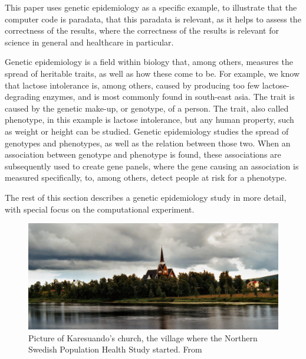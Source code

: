 This paper uses genetic epidemiology as a specific example,
to illustrate that the computer code is paradata,
that this paradata is relevant, as it helps 
to assess the correctness of the results,
where the correctness of the results is relevant for 
science in general and healthcare in particular.


Genetic epidemiology is a field within biology that, among 
others, measures the spread of heritable traits,
as well as how these come to be.
For example, we know that lactose intolerance is, among others,
caused by producing too few lactose-degrading enzymes,
and is most commonly found in south-east asia.
The trait is caused by the genetic make-up, or genotype, of a person.
The trait, also called phenotype, in this example is lactose intolerance,
but any human property, such as weight or height can be studied.
Genetic epidemiology studies the spread of genotypes and phenotypes,
as well as the relation between those two.
When an association between genotype and phenotype is found,
these associations are subsequently used to 
create gene panels, where the gene causing 
an association is measured specifically, to, among others,
detect people at risk for a phenotype.

The rest of this section describes a genetic epidemiology study 
in more detail, with special focus on the computational experiment.

\begin{figure}[!htbp]
  \centering
  \includegraphics[width=\linewidth]{Karesuando_church.jpg}
  \caption{
    Picture of Karesuando's church,
    the village where the Northern Swedish Population
    Health Study started.
    From \cite{hopfner2005}
  }
  \label{fig:karesuando_church}
\end{figure}

